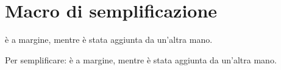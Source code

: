 \documentclass[12pt,italian]{article}
\begin{document}
\par
\section{Macro di semplificazione}
\par {} \`e a
margine, mentre  \`e stata aggiunta da un'altra
mano.  \par
\NomeTestimone{} Per semplificare:  \`e a margine, mentre  \`e stata aggiunta
da un'altra mano.  \par
\end{document}
